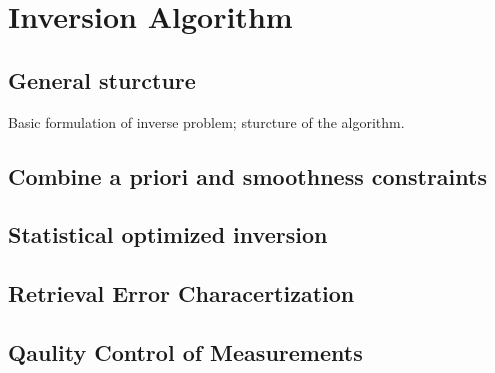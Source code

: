 \chapter{Inversion Algorithm} \label{ch:algorithm}

\section{General sturcture}

Basic formulation of inverse problem; sturcture of the algorithm.

\section{Combine a priori and smoothness constraints}

\section{Statistical optimized inversion}

\section{Retrieval Error Characertization}

\section{Qaulity Control of Measurements}


